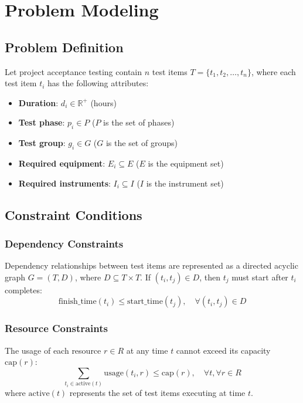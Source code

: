 \documentclass[journal]{IEEEtran}
\begin{document}
\section{Problem Modeling}

\subsection{Problem Definition}
Let project acceptance testing contain $n$ test items $T = \{t_1, t_2, \ldots, t_n\}$, where each test item $t_i$ has the following attributes:
\begin{itemize}
\item \textbf{Duration}: $d_i \in \mathbb{R}^+$ (hours)
\item \textbf{Test phase}: $p_i \in P$ ($P$ is the set of phases)
\item \textbf{Test group}: $g_i \in G$ ($G$ is the set of groups)
\item \textbf{Required equipment}: $E_i \subseteq E$ ($E$ is the equipment set)
\item \textbf{Required instruments}: $I_i \subseteq I$ ($I$ is the instrument set)
\end{itemize}

\subsection{Constraint Conditions}

\subsubsection{Dependency Constraints}
Dependency relationships between test items are represented as a directed acyclic graph $G = (T, D)$, where $D \subseteq T \times T$. If $(t_i, t_j) \in D$, then $t_j$ must start after $t_i$ completes:
\begin{equation}
\text{finish\_time}(t_i) \leq \text{start\_time}(t_j), \quad \forall(t_i, t_j) \in D
\end{equation}

\subsubsection{Resource Constraints}
The usage of each resource $r \in R$ at any time $t$ cannot exceed its capacity $\text{cap}(r)$:
\begin{equation}
\sum_{t_i \in \text{active}(t)} \text{usage}(t_i, r) \leq \text{cap}(r), \quad \forall t, \forall r \in R
\end{equation}
where $\text{active}(t)$ represents the set of test items executing at time $t$.
\end{document}
